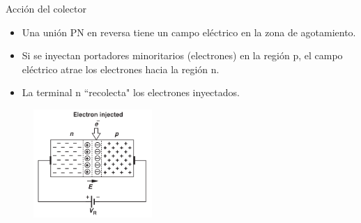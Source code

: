 \documentclass[t,aspectratio=169]{beamer}
\begin{document}
\begin{frame}{Acción del colector}

\begin{itemize}
    \item Una unión PN en reversa tiene un campo eléctrico en la zona de agotamiento.
    \item Si se inyectan portadores minoritarios (electrones) en la región p, el campo eléctrico atrae los electrones hacia la región n.
    \item La terminal n ``recolecta" los electrones inyectados.
\end{itemize}

\begin{figure}
    \centering
    \includegraphics[width=0.4\textwidth]{figures/transistor_accion_colector.png}
\end{figure}
    
\end{frame}
\end{document}
